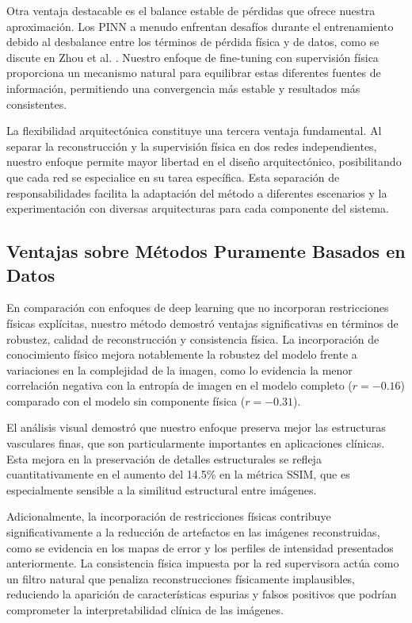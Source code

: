Otra ventaja destacable es el balance estable de pérdidas que ofrece nuestra aproximación. Los PINN a menudo enfrentan desafíos durante el entrenamiento debido al desbalance entre los términos de pérdida física y de datos, como se discute en Zhou et al. \cite{zhou2020physics}. Nuestro enfoque de fine-tuning con supervisión física proporciona un mecanismo natural para equilibrar estas diferentes fuentes de información, permitiendo una convergencia más estable y resultados más consistentes.

La flexibilidad arquitectónica constituye una tercera ventaja fundamental. Al separar la reconstrucción y la supervisión física en dos redes independientes, nuestro enfoque permite mayor libertad en el diseño arquitectónico, posibilitando que cada red se especialice en su tarea específica. Esta separación de responsabilidades facilita la adaptación del método a diferentes escenarios y la experimentación con diversas arquitecturas para cada componente del sistema.

\subsection{Ventajas sobre Métodos Puramente Basados en Datos}

En comparación con enfoques de deep learning que no incorporan restricciones físicas explícitas, nuestro método demostró ventajas significativas en términos de robustez, calidad de reconstrucción y consistencia física. La incorporación de conocimiento físico mejora notablemente la robustez del modelo frente a variaciones en la complejidad de la imagen, como lo evidencia la menor correlación negativa con la entropía de imagen en el modelo completo ($r=-0.16$) comparado con el modelo sin componente física ($r=-0.31$).

El análisis visual demostró que nuestro enfoque preserva mejor las estructuras vasculares finas, que son particularmente importantes en aplicaciones clínicas. Esta mejora en la preservación de detalles estructurales se refleja cuantitativamente en el aumento del 14.5\% en la métrica SSIM, que es especialmente sensible a la similitud estructural entre imágenes.

Adicionalmente, la incorporación de restricciones físicas contribuye significativamente a la reducción de artefactos en las imágenes reconstruidas, como se evidencia en los mapas de error y los perfiles de intensidad presentados anteriormente. La consistencia física impuesta por la red supervisora actúa como un filtro natural que penaliza reconstrucciones físicamente implausibles, reduciendo la aparición de características espurias y falsos positivos que podrían comprometer la interpretabilidad clínica de las imágenes.


